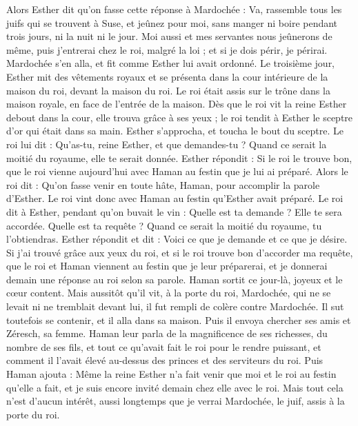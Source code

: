 \begin{multicols}{2}
Alors Esther dit qu’on fasse cette réponse à Mardochée :
Va, rassemble tous les juifs qui se trouvent à Suse, et jeûnez pour moi, sans manger ni boire pendant trois jours, ni la nuit ni le jour. Moi aussi et mes servantes nous jeûnerons de même, puis j'entrerai chez le roi, malgré la loi ; et si je dois périr, je périrai.
Mardochée s'en alla, et fit comme Esther lui avait ordonné.
\VerseOne{}Le troisième jour, Esther mit des vêtements royaux et se présenta dans la cour intérieure de la maison du roi, devant la maison du roi. Le roi était assis sur le trône dans la maison royale, en face de l’entrée de la maison.
Dès que le roi vit la reine Esther debout dans la cour, elle trouva grâce à ses yeux ; le roi tendit à Esther le sceptre d'or qui était dans sa main. Esther s'approcha, et toucha le bout du sceptre.
Le roi lui dit : Qu'as-tu, reine Esther, et que demandes-tu ? Quand ce serait la moitié du royaume, elle te serait donnée.
Esther répondit : Si le roi le trouve bon, que le roi vienne aujourd'hui avec Haman au festin que je lui ai préparé.
Alors le roi dit : Qu'on fasse venir en toute hâte, Haman, pour accomplir la parole d'Esther. Le roi vint donc avec Haman au festin qu'Esther avait préparé.
Le roi dit à Esther, pendant qu’on buvait le vin : Quelle est ta demande ? Elle te sera accordée. Quelle est ta requête ? Quand ce serait la moitié du royaume, tu l’obtiendras.
Esther répondit et dit : Voici ce que je demande et ce que je désire.
Si j'ai trouvé grâce aux yeux du roi, et si le roi trouve bon d'accorder ma requête, que le roi et Haman viennent au festin que je leur préparerai, et je donnerai demain une réponse au roi selon sa parole.
Haman sortit ce jour-là, joyeux et le cœur content. Mais aussitôt qu'il vit, à la porte du roi, Mardochée, qui ne se levait ni ne tremblait devant lui, il fut rempli de colère contre Mardochée.
Il sut toutefois se contenir, et il alla dans sa maison. Puis il envoya chercher ses amis et Zéresch, sa femme.
Haman leur parla de la magnificence de ses richesses, du nombre de ses fils, et tout ce qu’avait fait le roi pour le rendre puissant, et comment il l'avait élevé au-dessus des princes et des serviteurs du roi.
Puis Haman ajouta : Même la reine Esther n'a fait venir que moi et le roi au festin qu'elle a fait, et je suis encore invité demain chez elle avec le roi.
Mais tout cela n’est d’aucun intérêt, aussi longtemps que je verrai Mardochée, le juif, assis à la porte du roi.

\end{multicols}
